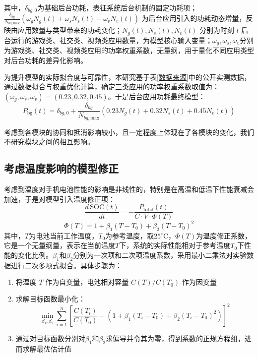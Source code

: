 \documentclass{mcmthesis}  %
\begin{document}
\begin{enumerate}[label=\arabic*.]
		其中，$\delta_{bg,0}$为基础后台功耗，表征系统后台机制的固定功耗项；$\frac{\delta_{bg}}{N_{bg,\text{max}}} \left( \omega_g N_g(t) + \omega_s N_s(t) + \omega_v N_v(t) \right)$ 为后台应用引入的功耗动态增量，反映由应用数量与类型带来的功耗变化；$N_g(t), N_s(t), N_v(t)$ 分别为时刻 $t$ 后台运行的游戏类、社交类、视频类应用数量，为模型核心输入变量；$\omega_g, \omega_s,\omega_v$分别为游戏类、社交类、视频类应用的功率权重系数，无量纲，用于量化不同应用类型对后台功耗的差异化影响。
		
		为提升模型的实际拟合度与可靠性，本研究基于表\ref{数据来源}中的公开实测数据，通过数据拟合与权重优化计算，确定三类应用的功率权重系数取值为：$(\omega_g, \omega_s, \omega_v) = (0.23, 0.32, 0.45)$。于是后台应用功耗最终模型：
		\begin{equation}
			P_{\text{bg}}(t) = \delta_{bg,0} + \frac{\delta_{bg}}{N_{bg,\text{max}}} \left( 0.23 N_g(t) + 0.32 N_s(t) + 0.45 N_v(t) \right)
		\end{equation}
		
		考虑到各模块的协同和抵消影响较小，且一定程度上体现在了各模块的变化，我们不研究模块之间的相互影响。
		
	\end{enumerate}
		
		\subsection{考虑温度影响的模型修正}
		
		考虑到温度对手机电池性能的影响是非线性的，特别是在高温和低温下性能衰减会加速，于是对模型引入温度修正项：
		\begin{equation}
			\frac{d\,\text{SOC}(t)}{dt} = -\frac{P_{\text{total}}(t)}{C \cdot V \cdot \Phi(T)}
		\end{equation}
		\begin{equation}
			\Phi(T) = 1 + \beta_1(T - T_0) + \beta_2(T - T_0)^2
		\end{equation}
		其中，$T$为电池当前工作温度，$T_0$为参考温度，取$25^\circ\text{C}$，$\Phi(T)$为温度修正系数，它是一个无量纲量，表示在当前温度$T$下，系统的实际性能相对于参考温度$T_0$下性能的变化比例。$\beta_1$和$\beta_2$分别为一次项和二次项温度系数，采用最小二乘法对实验数据进行二次多项式拟合。具体步骤为：
		
		\begin{enumerate}[label=\arabic*.]
			\item 将温度 $T$ 作为自变量，电池相对容量 $C(T)/C(T_0)$ 作为因变量
			\item 求解目标函数最小化：
			\[
			\min_{\beta_1,\beta_2} \sum_{i=1}^{n} \left[ \frac{C(T_i)}{C(T_0)} - \left(1 + \beta_1(T_i - T_0) + \beta_2(T_i - T_0)^2\right) \right]^2
			\]
			\item 通过对目标函数分别对$\beta_1$和$\beta_2$求偏导并令其为零，得到系数的正规方程组，进而求解最优估计值
		\end{enumerate}
		
\end{document}
